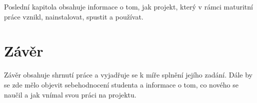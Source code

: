 \documentclass[11pt,a4paper,twoside,openright]{report}
\let\openright=\cleardoublepage
\begin{document}
Poslední kapitola obsahuje informace o tom, jak projekt, který v rámci maturitní práce vznikl, nainstalovat, spustit a používat.

\chapter*{Závěr}

\pagestyle{empty}

Závěr obsahuje shrnutí práce a vyjadřuje se k míře splnění jejího zadání. Dále by se zde mělo objevit sebehodnocení studenta a informace o tom, co nového se naučil a jak vnímal svou práci na projektu.

\nocite{einstein}\nocite{latexcompanion}\nocite{knuthwebsite}
\printbibliography[title={Seznam použité literatury},heading={bibintoc}]

\openright
\listoffigures
{}

\clearpage
\listoftables
{}


\end{document}
